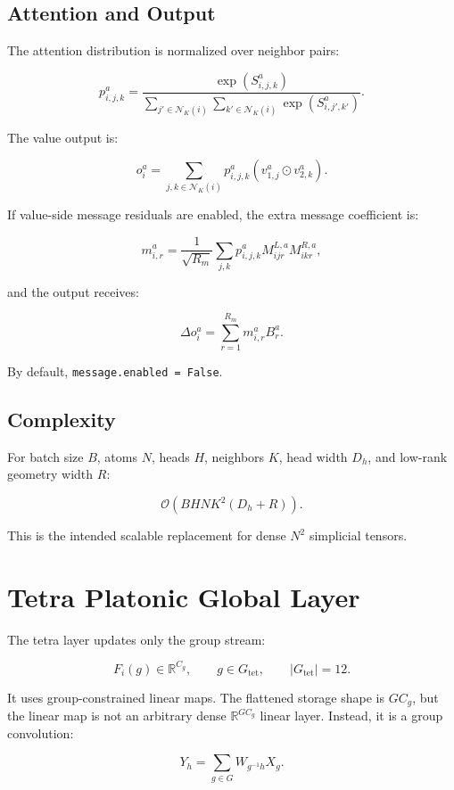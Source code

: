 \documentclass[11pt]{article}
\begin{document}
\subsection{Attention and Output}

The attention distribution is normalized over neighbor pairs:

\[
  p^a_{i,j,k}
  =
  \frac{\exp(S^a_{i,j,k})}
  {\sum_{j'\in\mathcal{N}_K(i)}
   \sum_{k'\in\mathcal{N}_K(i)}
   \exp(S^a_{i,j',k'})}.
\]

The value output is:

\[
  o_i^a
  =
  \sum_{j,k\in\mathcal{N}_K(i)}
  p^a_{i,j,k}
  \left(
    v^a_{1,j}\odot v^a_{2,k}
  \right).
\]

If value-side message residuals are enabled, the extra message coefficient is:

\[
  m^a_{i,r}
  =
  \frac{1}{\sqrt{R_m}}
  \sum_{j,k}
  p^a_{i,j,k}
  M^{L,a}_{ijr}
  M^{R,a}_{ikr},
\]

and the output receives:

\[
  \Delta o^a_i
  =
  \sum_{r=1}^{R_m}m^a_{i,r}B^a_{r}.
\]

By default, \texttt{message.enabled = False}.

\subsection{Complexity}

For batch size \(B\), atoms \(N\), heads \(H\), neighbors \(K\), head width
\(D_h\), and low-rank geometry width \(R\):

\[
  \mathcal{O}\left(B H N K^2(D_h+R)\right).
\]

This is the intended scalable replacement for dense \(N^2\) simplicial tensors.

\section{Tetra Platonic Global Layer}

The tetra layer updates only the group stream:

\[
  F_i(g)\in\mathbb{R}^{C_g},
  \qquad g\in G_{\mathrm{tet}},
  \qquad |G_{\mathrm{tet}}|=12.
\]

It uses group-constrained linear maps.  The flattened storage shape is
\(G C_g\), but the linear map is not an arbitrary dense \(\mathbb{R}^{GC_g}\)
linear layer.  Instead, it is a group convolution:

\[
  Y_h
  =
  \sum_{g\in G}
  W_{g^{-1}h}X_g.
\]
\end{document}
